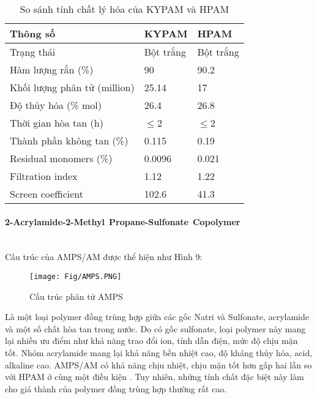 \documentclass[12pt,a4paper]{article}
\newcommand{\subsubsubsection}[1]{\paragraph{#1}\mbox{}\\}
\begin{document}
\begin{table}[h]
\centering
\caption{So sánh tính chất lý hóa của KYPAM và HPAM \cite{sheng2010modern}}
\label{my-label}
\begin{tabularx}{\textwidth}{@{}XXX@{}}
\toprule
\textbf{Thông số} & \textbf{KYPAM} & \textbf{HPAM} \\ \midrule
Trạng thái                         & Bột trắng                       & Bột trắng                      \\
Hàm lượng rắn (\%)                 & 90                              & 90.2                           \\
Khối lượng phân tử (million)       & 25.14                           & 17                             \\
Độ thủy hóa (\% mol)               & 26.4                            & 26.8                           \\
Thời gian hòa tan (h)              & $\leq$2                         & $\leq$2                        \\
Thành phần không tan (\%)     & 0.115                           & 0.19                           \\
Residual monomers (\%)             & 0.0096                          & 0.021                          \\
Filtration index                   & 1.12                            & 1.22                           \\
Screen coefficient                 & 102.6                           & 41.3                           \\ \bottomrule
\end{tabularx}
\end{table}
	\newpage
	\subsubsubsection{2-Acrylamide-2-Methyl Propane-Sulfonate Copolymer}
	Cấu trúc của AMPS/AM được thể hiện như Hình 9:\\
	\begin{figure}[h]
		\centering
		\texttt{[image: Fig/AMPS.PNG]}
		\caption{Cấu trúc phân tử AMPS \cite{sheng2010modern}}
	\end{figure}
	\newline
	Là một loại polymer đồng trùng hợp giữa các gốc Natri và Sulfonate, acrylamide và một số chất hòa tan trong nước. Do có gốc sulfonate, loại polymer này mang lại nhiều ưu điểm như khả năng trao đổi ion, tính dẫn điện, mức độ chịu mặn tốt. Nhóm acrylamide mang lại khả năng bền nhiệt cao, độ kháng thủy hóa, acid, alkaline cao. AMPS/AM có khả năng chịu nhiệt, chịu mặn tốt hơn gấp hai lần so với HPAM ở cùng một điều kiện \cite{sheng2010modern}. Tuy nhiên, những tính chất đặc biệt này làm cho giá thành của polymer đồng trùng hợp thường rất cao.
\end{document}
